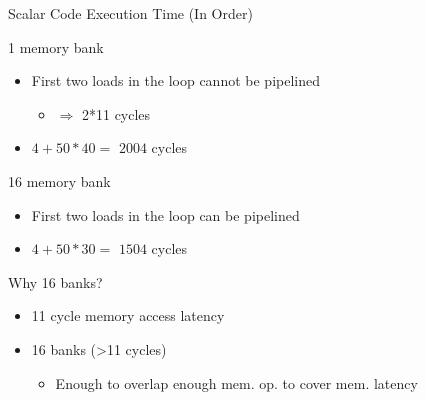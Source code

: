 \documentclass[presentation]{beamer}
\begin{document}
\begin{frame}[label={sec:org817acfd}]{Scalar Code Execution Time (In Order)}
\begin{block}{1 memory bank}
\begin{itemize}
\item First two loads in the loop cannot be pipelined
\begin{itemize}
\item \(\Rightarrow\) 2*11 cycles
\end{itemize}
\item \(4 + 50*40 =\) \alert{\(2004\)} cycles
\end{itemize}
\pause
\end{block}
\begin{block}{\alert{16} memory bank}
\begin{itemize}
\item First two loads in the loop can be pipelined
\item \(4 + 50*30 =\) \alert{\(1504\)} cycles
\end{itemize}
\pause
\end{block}
\begin{block}{Why \alert{16} banks?}
\pause
\begin{itemize}
\item 11 cycle memory access latency
\item 16 banks (>11 cycles)
\begin{itemize}
\item Enough to overlap enough mem. op. to cover mem. latency
\end{itemize}
\end{itemize}
\end{block}
\end{frame}
\end{document}
